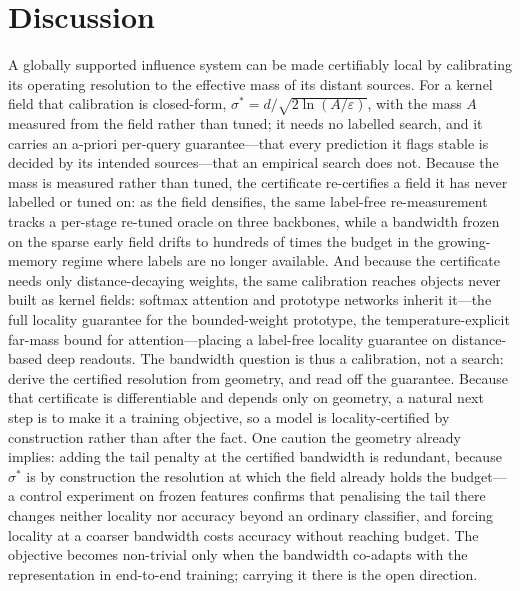 \documentclass[10pt,twocolumn]{article}
\newcommand{\sstar}{\sigma^{*}}
\begin{document}
\section{Discussion}
A globally supported influence system can be made certifiably local by calibrating its operating resolution to the effective mass of its distant sources. For a kernel field that calibration is closed-form, $\sstar=d/\sqrt{2\ln(A/\varepsilon)}$, with the mass $A$ measured from the field rather than tuned; it needs no labelled search, and it carries an a-priori per-query guarantee---that every prediction it flags stable is decided by its intended sources---that an empirical search does not. Because the mass is measured rather than tuned, the certificate re-certifies a field it has never labelled or tuned on: as the field densifies, the same label-free re-measurement tracks a per-stage re-tuned oracle on three backbones, while a bandwidth frozen on the sparse early field drifts to hundreds of times the budget in the growing-memory regime where labels are no longer available. And because the certificate needs only distance-decaying weights, the same calibration reaches objects never built as kernel fields: softmax attention and prototype networks inherit it---the full locality guarantee for the bounded-weight prototype, the temperature-explicit far-mass bound for attention---placing a label-free locality guarantee on distance-based deep readouts. The bandwidth question is thus a calibration, not a search: derive the certified resolution from geometry, and read off the guarantee. Because that certificate is differentiable and depends only on geometry, a natural next step is to make it a training objective, so a model is locality-certified by construction rather than after the fact. One caution the geometry already implies: adding the tail penalty at the certified bandwidth is redundant, because $\sstar$ is by construction the resolution at which the field already holds the budget---a control experiment on frozen features confirms that penalising the tail there changes neither locality nor accuracy beyond an ordinary classifier, and forcing locality at a coarser bandwidth costs accuracy without reaching budget. The objective becomes non-trivial only when the bandwidth co-adapts with the representation in end-to-end training; carrying it there is the open direction.
\end{document}
